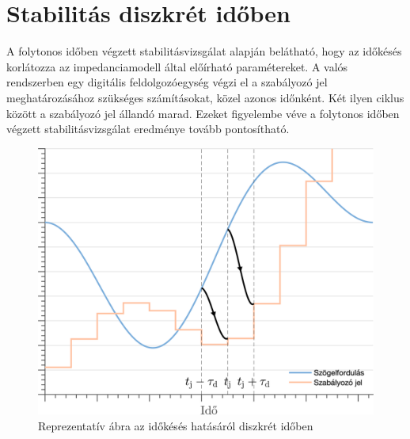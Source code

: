\section{Stabilitás diszkrét időben}
A folytonos időben végzett stabilitásvizsgálat alapján belátható, hogy az 
időkésés korlátozza az impedanciamodell által előírható paramétereket.
A valós rendszerben egy digitális feldolgozóegység végzi el a szabályozó jel
meghatározásához szükséges számításokat, közel azonos időnként. Két ilyen 
ciklus között a szabályozó jel állandó marad. Ezeket figyelembe véve a 
folytonos időben végzett stabilitásvizsgálat eredménye tovább pontosítható.
\begin{figure}[ht]
    \begin{center}
    \includegraphics[width=12cm]{images/time_delay_example_discrete.png}
    \caption{Reprezentatív ábra az időkésés hatásáról diszkrét időben}\label{fig:time_delay_example_discrete}
    \end{center}
\end{figure}

